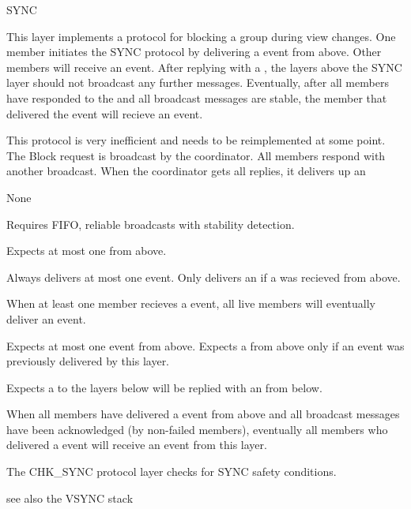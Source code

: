 \begin{Layer}{SYNC}

This layer implements a protocol for blocking a group during view changes.  One
member initiates the SYNC protocol by delivering a  event from above.
Other members will receive an  event.  After replying with a
, the layers above the SYNC layer should not broadcast any further
messages.  Eventually, after all members have responded to the  and
all broadcast messages are stable, the member that delivered the 
event will recieve an  event.

\begin{Protocol}
This protocol is very inefficient and needs to be reimplemented at some
point.  The Block request is broadcast by the coordinator.  All members
respond with another broadcast.  When the coordinator gets all replies, it
delivers up an 
\end{Protocol}

\begin{Parameters}
\item None
\end{Parameters}

\begin{Properties}
\item
Requires FIFO, reliable broadcasts with stability detection.
\item
Expects at most one  from above.
\item
Always delivers at most one  event.  Only delivers an
 if a  was recieved from above.
\item
When at least one member recieves a  event, all live members will
eventually deliver an  event.
\item
Expects at most one  event from above.  Expects a  from
above only if an  event was previously delivered by this layer.
\item
Expects a  to the layers below will be replied with an  from
below.
\item
When all members have delivered a  event from above and all
broadcast messages have been acknowledged (by non-failed members),
eventually all members who delivered a  event will receive an
 event from this layer.
\end{Properties}

\begin{Sources}
\end{Sources}

\begin{GenEvent}
\end{GenEvent}

\begin{Testing}
\item
The CHK\_SYNC protocol layer checks for SYNC safety conditions.
\item 
see also the VSYNC stack
\end{Testing}
\end{Layer}

